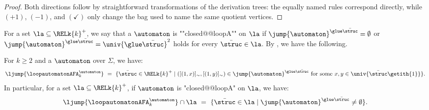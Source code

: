 \documentclass[a4paper,UKenglish,cleveref, autoref, thm-restate]{lipics-v2021}
\DeclarePairedDelimiter\set{\{}{\}}
\DeclarePairedDelimiter\tuple{(}{)}
\newcommand{\mul}[1]{\bar{#1}}
\newcommand{\vsig}{\Sigma}
\begin{document}
\begin{proof}
Both directions follow by straightforward transformations of the derivation trees:
the equally named rules correspond directly, while $(+1)$, $(-1)$, and $(\checkmark)$
only change the bag used to name the same quotient vertices.
\end{proof}
For a set $\la \subseteq \RELk{k}^{+}$,
we say that a  $\automaton$ is ""closed@@loopA"" on $\la$ if $\jump{\automaton}^{\glue \mul{\struc}} = \emptyset$ or $\jump{\automaton}^{\glue \mul{\struc}} = \univ{\glue \mul{\struc}}^2$ holds for every $\mul{\struc} \in \la$.
By , we have the following.
\begin{lem}\label{lemma: to 2AFA}
    For $k \ge 2$ and a  $\automaton$ over $\vsig$,
    we have:
    \[\ljump{\loopautomatonAFA_{k}^{\automaton}} ~=~ \set{\mul{\struc} \in \RELk{k}^{+} \mid \tuple{[\tuple{1,x}]_{\sim}, [\tuple{1,y}]_{\sim}} \in \jump{\automaton}^{\glue \mul{\struc}} \mbox{ for some $x, y \in \univ{\mul{\struc}\getith{1}}$}}.\]
    In particular, for a set $\la \subseteq \RELk{k}^{+}$, if $\automaton$ is "closed@@loopA" on $\la$,
    we have:
    \[\ljump{\loopautomatonAFA_{k}^{\automaton}} \cap \la ~=~ \set{\mul{\struc} \in \la \mid \jump{\automaton}^{\glue \mul{\struc}} \neq \emptyset}.\]
\end{lem}
\end{document}
